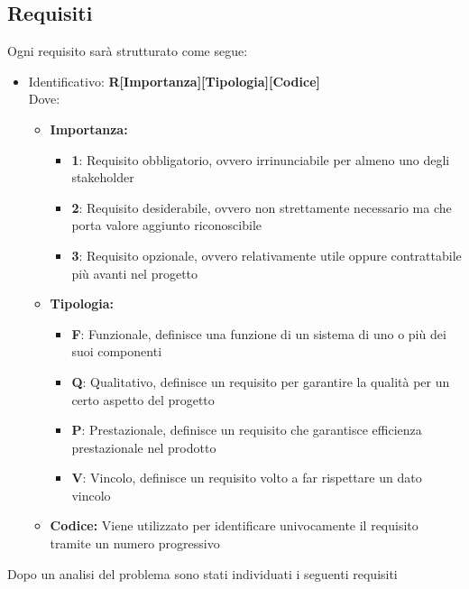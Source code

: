 \subsection{Requisiti}
Ogni requisito sarà strutturato come segue:
\begin{itemize}
	\item Identificativo: \textbf{R[Importanza][Tipologia][Codice]}\\
	Dove:
	\begin{itemize}
		\item \textbf{Importanza:}
		\begin{itemize}
			\item \textbf{1}: Requisito obbligatorio, ovvero irrinunciabile per almeno uno degli stakeholder
			\item \textbf{2}: Requisito desiderabile, ovvero non strettamente necessario ma che porta valore aggiunto riconoscibile
			\item \textbf{3}: Requisito opzionale, ovvero relativamente utile oppure contrattabile più avanti nel progetto
		\end{itemize}
		\item \textbf{Tipologia:}
		\begin{itemize}
			\item \textbf{F}: Funzionale, definisce una funzione di un sistema di uno o più dei suoi componenti
			\item \textbf{Q}: Qualitativo, definisce un requisito per garantire la qualità per un certo aspetto del progetto
			\item \textbf{P}: Prestazionale, definisce un requisito che garantisce efficienza prestazionale nel prodotto
			\item \textbf{V}: Vincolo, definisce un requisito volto a far rispettare un dato vincolo
		\end{itemize}
		\item \textbf{Codice:} Viene utilizzato per identificare univocamente il requisito tramite un numero progressivo\\
	\end{itemize}
\end{itemize}
Dopo un analisi del problema sono stati individuati i seguenti requisiti
